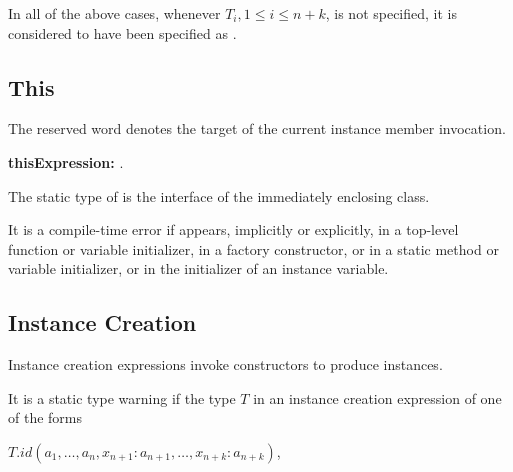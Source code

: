 \documentclass{article}
\begin{document}
\LMHash{}
In all of the above cases, whenever $T_i, 1 \le i \le n+k$, is not specified, it is considered to have been specified as  \DYNAMIC{}.


\subsection{ This}

\LMHash{}
The reserved word \THIS{} denotes the target of the current instance member invocation.

\begin{grammar}
{\bf thisExpression:}
      \THIS{}
     .
\end{grammar}

\LMHash{}
The static type of \THIS{} is the interface of the immediately enclosing class.


\LMHash{}
It is a compile-time error if \THIS{} appears, implicitly or explicitly,  in a top-level function or variable initializer,  in a factory constructor, or in a static method or variable initializer, or in the initializer of an instance variable. 

\subsection{ Instance Creation}

\LMHash{}
Instance creation expressions invoke constructors to produce instances. 



\LMHash{}
It is a static type warning if
the type $T$ in an instance creation expression of one of  the forms 

\NEW{} $T.id(a_1, \ldots , a_n, x_{n+1}: a_{n+1}, \ldots , x_{n+k}: a_{n+k})$,  
\end{document}
